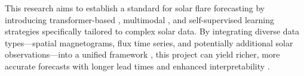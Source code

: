 This research aims to establish a standard for solar flare forecasting by introducing transformer-based \cite{RefWorks:RefID:3-vaswani2023provided,RefWorks:RefID:29-hoffmanntraining}, multimodal \cite{RefWorks:RefID:30-schmude2024prithvi}, and self-supervised learning strategies specifically tailored to complex solar data. By integrating diverse data types—spatial magnetograms, flux time series, and potentially additional solar observations—into a unified framework \cite{RefWorks:RefID:33-francisco2024multimodal,RefWorks:RefID:2-abduallah2023operational}, this project can yield richer, more accurate forecasts with longer lead times and enhanced interpretability \cite{RefWorks:RefID:35-licllmate:}.
